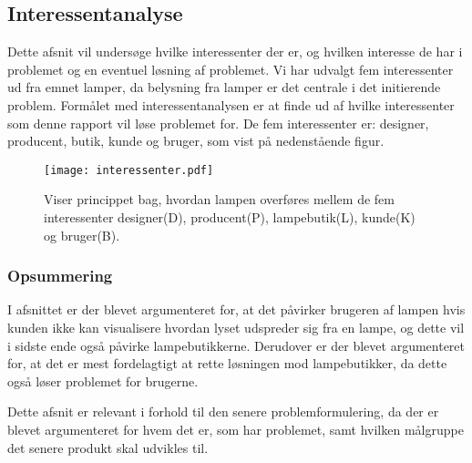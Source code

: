 \subsection{Interessentanalyse}
Dette afsnit vil undersøge hvilke interessenter der er, og hvilken interesse de har i problemet og en eventuel løsning af problemet. Vi har udvalgt fem interessenter ud fra emnet lamper, da belysning fra lamper er det centrale i det initierende problem. Formålet med interessentanalysen er at finde ud af hvilke interessenter som denne rapport vil løse problemet for. De fem interessenter er: designer, producent, butik, kunde og bruger, som vist på nedenstående figur.

\begin{figure}[H]
	\center\texttt{[image: interessenter.pdf]}
	\center\caption{Viser princippet bag, hvordan lampen overføres mellem de fem interessenter designer(D), producent(P), lampebutik(L), kunde(K) og bruger(B).}
    \label{fig:interessenter}
\end{figure}















\subsubsection*{Opsummering}
I afsnittet er der blevet argumenteret for, at det påvirker brugeren af lampen hvis kunden ikke kan visualisere hvordan lyset udspreder sig fra en lampe, og dette vil i sidste ende også påvirke lampebutikkerne. Derudover er der blevet argumenteret for, at det er mest fordelagtigt at rette løsningen mod lampebutikker, da dette også løser problemet for brugerne.

Dette afsnit er relevant i forhold til den senere problemformulering, da der er blevet argumenteret for hvem det er, som har problemet, samt hvilken målgruppe det senere produkt skal udvikles til.
